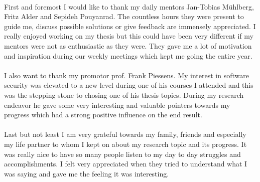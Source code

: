 \documentclass[master=cws,masteroption=vs,english]{kulemt}
\begin{document}
\begin{preface}

\paragraph*{}
First and foremost I would like to thank my daily mentors Jan-Tobias M\"uhlberg, Fritz Alder and Sepideh Pouyanrad. The countless hours they were present to guide me, discuss possible solutions or give feedback are immensely appreciated. I really enjoyed working on my thesis but this could have been very different if my mentors were not as enthusiastic as they were. They gave me a lot of motivation and inspiration during our weekly meetings which kept me going the entire year.

\paragraph*{}
I also want to thank my promotor prof. Frank Piessens. My interest in software security was elevated to a new level during one of his courses I attended and this was the stepping stone to chosing one of his thesis topics. During my research endeavor he gave some very interesting and valuable pointers towards my progress which had a strong positive influence on the end result.

\paragraph*{}
Last but not least I am very grateful towards my family, friends and especially my life partner to whom I kept on about my research topic and its progress. It was really nice to have so many people listen to my day to day struggles and accomplishments. I felt very appreciated when they tried to understand what I was saying and gave me the feeling it was interesting.
 
\end{preface}

\tableofcontents*
\end{document}
